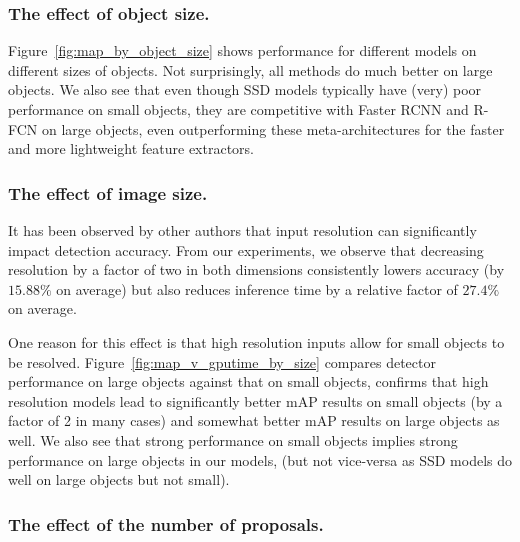 \documentclass[10pt,twocolumn,letterpaper]{article}
\renewcommand{\paragraph}[1]{\subsubsection{#1}}
\begin{document}
\paragraph{The effect of object size.}
\vspace{-2mm}
Figure~\ref{fig:map_by_object_size} shows performance for different
models on different sizes of objects.
Not surprisingly, all methods do much better on large objects.
We also see that even though SSD models
typically have (very) poor performance on small objects, they are
competitive with Faster RCNN and R-FCN on large objects, even
outperforming these meta-architectures 
for the faster and more lightweight feature extractors.


\paragraph{The effect of image size.}


It has been observed by other authors that  input resolution can
significantly impact detection accuracy.  From our experiments, we
observe that decreasing resolution by a factor of two in both
dimensions consistently lowers accuracy (by $15.88\%$ on average) but
also reduces inference time by a relative factor of $27.4\%$ on
average. 

One reason for this effect is that high resolution inputs allow for
small objects to be resolved. Figure~\ref{fig:map_v_gputime_by_size}
compares detector performance on large objects against that on
small objects, confirms that high resolution models lead to
significantly better mAP results on small objects (by a factor of 2 in
many cases) and somewhat better mAP results on large objects as well.  
We also see that strong performance on small objects implies strong
performance on large objects in our models, (but not vice-versa as SSD
models do well on large objects but not small). 





\paragraph{The effect of the number of proposals.}
\end{document}
